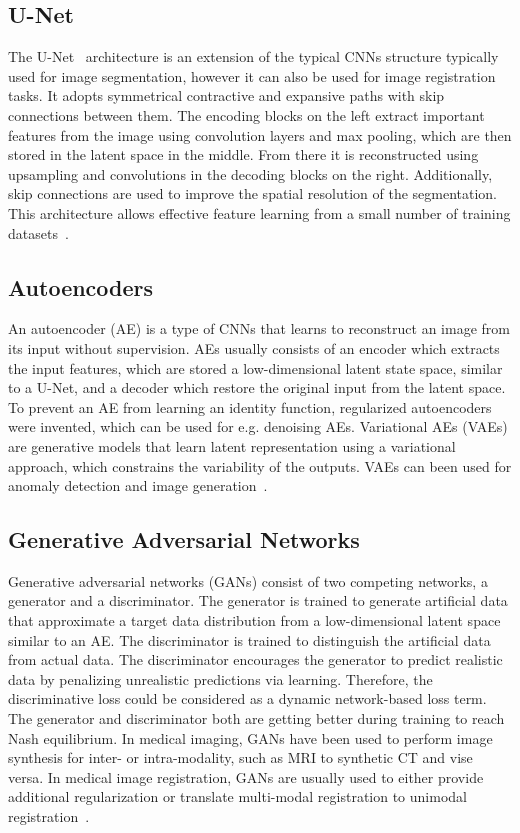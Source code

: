 \documentclass[english,version-2022-01]{uzl-thesis} %
\begin{document}
\subsection{U-Net}
The U-Net~\cite{U-Net} architecture is an extension of the typical CNNs structure typically used for image segmentation, however it can also be used for image registration tasks. It adopts symmetrical contractive and expansive paths with skip connections between them. The encoding blocks on the left extract important features from the image using convolution layers and max pooling, which are then stored in the latent space in the middle. From there it is reconstructed using upsampling and convolutions in the decoding blocks on the right. Additionally, skip connections are used to improve the spatial resolution of the segmentation. This architecture allows effective feature learning from a small number of training datasets~\cite{Fu2020}. 

\subsection{Autoencoders}
An autoencoder (AE) is a type of CNNs that learns to reconstruct an image from its input without supervision. AEs usually consists of an encoder which extracts the input features, which are stored a low-dimensional latent state space, similar to a U-Net, and a decoder which restore the original input from the latent space. To prevent an AE from learning an identity function, regularized autoencoders were invented, which can be used for e.g. denoising AEs. Variational AEs (VAEs) are generative models that learn latent representation using a variational approach, which constrains the variability of the outputs. VAEs can been used for anomaly detection and image generation~\cite{Fu2020}.

\subsection{Generative Adversarial Networks}
Generative adversarial networks (GANs) consist of two competing networks, a generator and a discriminator. The generator is trained to generate artificial data that approximate a target data distribution from a low-dimensional latent space similar to an AE. The discriminator is trained to distinguish the artificial data from actual data. The discriminator encourages the generator to predict realistic data by penalizing unrealistic predictions via learning. Therefore, the discriminative loss could be considered as a dynamic network-based loss term. The generator and discriminator both are getting better during training to reach Nash equilibrium. In medical imaging, GANs have been used to perform image synthesis for inter- or intra-modality, such as MRI to synthetic CT and vise versa. In medical image registration, GANs are usually used to either provide additional regularization or translate multi-modal registration to unimodal registration~\cite{Fu2020}.
\end{document}
